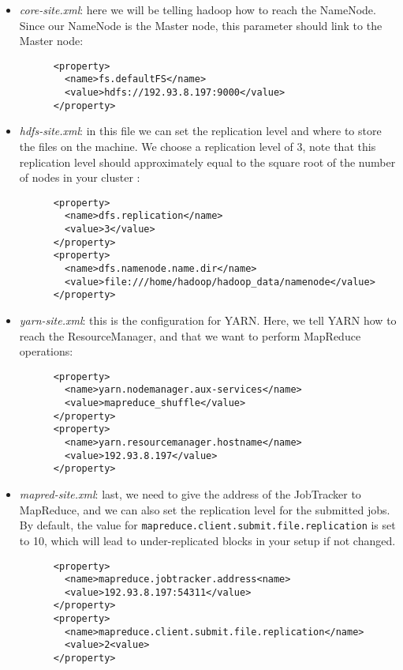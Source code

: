\documentclass[a4paper, 12pt]{article}
\begin{document}
\begin{itemize}
  \item \textit{core-site.xml}: here we will be telling hadoop how to reach the NameNode. Since our NameNode is the Master node, this parameter should link to the Master node:
    \lstset{language=xml}
    \begin{lstlisting}
      <property>
        <name>fs.defaultFS</name>
        <value>hdfs://192.93.8.197:9000</value>
      </property>
    \end{lstlisting}
  \item \textit{hdfs-site.xml}: in this file we can set the replication level and where to store the files on the machine. We choose a replication level of 3, note that this replication level should approximately equal to the square root of the number of nodes in your cluster \cite{hadoop_mapred_default}:
    \lstset{language=xml}
    \begin{lstlisting}
      <property>
        <name>dfs.replication</name>
        <value>3</value>
      </property>
      <property>
        <name>dfs.namenode.name.dir</name>
        <value>file:///home/hadoop/hadoop_data/namenode</value>
      </property>
    \end{lstlisting}
  \item \textit{yarn-site.xml}: this is the configuration for YARN. Here, we tell YARN how to reach the ResourceManager, and that we want to perform MapReduce operations:
    \lstset{language=xml}
    \begin{lstlisting}
      <property>
        <name>yarn.nodemanager.aux-services</name>
        <value>mapreduce_shuffle</value>
      </property>
      <property>
        <name>yarn.resourcemanager.hostname</name>
        <value>192.93.8.197</value>
      </property>
    \end{lstlisting}
  \item \textit{mapred-site.xml}: last, we need to give the address of the JobTracker to MapReduce, and we can also set the replication level for the submitted jobs. By default, the value for \texttt{mapreduce.client.submit.file.replication} is set to 10, which will lead to under-replicated blocks in your setup if not changed.
    \lstset{language=xml}
    \begin{lstlisting}
      <property>
        <name>mapreduce.jobtracker.address<name>
        <value>192.93.8.197:54311</value>
      </property>
      <property>
        <name>mapreduce.client.submit.file.replication</name>
        <value>2<value>
      </property>
    \end{lstlisting}
\end{itemize}
\end{document}
